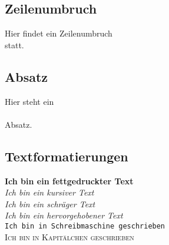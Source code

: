 \documentclass[a4paper,12pt]{article}
\begin{document}
\newpage
\subsection{Zeilenumbruch}
	Hier findet ein Zeilenumbruch \\ statt.
\subsection{Absatz}
	Hier steht ein \\ \\ Absatz.
\subsection{Textformatierungen}
	\textbf{Ich bin ein fettgedruckter Text} \\ 
	\textit{Ich bin ein kursiver Text}\\
	\textsl{Ich bin ein schräger Text}\\
	\emph{Ich bin ein hervorgehobener Text}\\
	\texttt{Ich bin in Schreibmaschine geschrieben}\\
	\textsc{Ich bin in Kapitälchen geschrieben}\\



\end{document}
